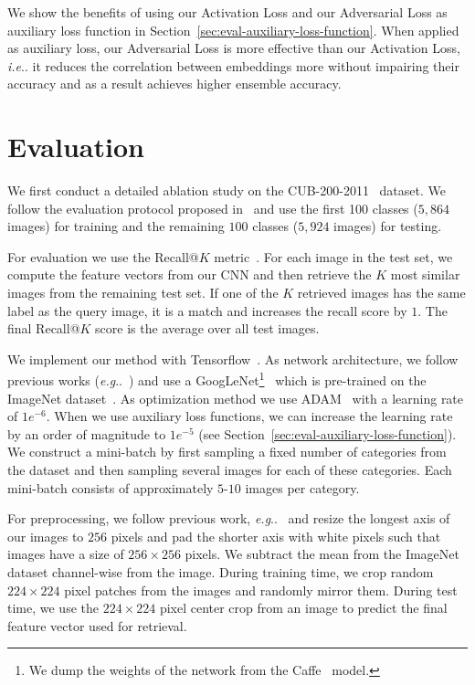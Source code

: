 \documentclass[10pt,journal,compsoc]{IEEEtran}
\makeatletter
\DeclareRobustCommand\onedot{\futurelet\@let@token\@onedot}
\def\@onedot{\ifx\@let@token.\else.\null\fi\xspace}
\def\eg{\emph{e.g}\onedot} \def\Eg{\emph{E.g}\onedot}
\def\ie{\emph{i.e}\onedot} \def\Ie{\emph{I.e}\onedot}
\makeatother
\begin{document}
We show the benefits of using our Activation Loss and our Adversarial Loss
as auxiliary loss function in
Section~\ref{sec:eval-auxiliary-loss-function}. When applied as auxiliary loss, our Adversarial
Loss is more effective than our Activation Loss, \ie it reduces the correlation
between embeddings more without impairing their accuracy and as a result achieves
higher ensemble accuracy.

\section{Evaluation}\label{sec:evaluation}

We first conduct a detailed ablation study on the CUB-200-2011~\cite{WahCUB_200_2011} dataset.
We follow the evaluation protocol proposed
in~\cite{oh2016deep} and use the first 100
classes ($5,864$ images) for training and the remaining $100$ classes ($5,924$
images) for testing.

For evaluation we use the Recall@$K$ metric~\cite{oh2016deep}. For each
image in the test set, we compute the feature vectors from our \ac{CNN} and
then retrieve the $K$ most similar images from the remaining test set. If one
of the $K$ retrieved images has the same label as the query image, it is a
match and increases the recall score by $1$.  The final Recall@$K$ score is the
average over all test images.

We implement our method with Tensorflow~\cite{tensorflow2015-whitepaper}. 
As network architecture, we follow previous works (\eg~\cite{oh2016deep, ustinova2016histogram}) and use a GoogLeNet\footnote{We dump the weights of the network from the Caffe~\cite{jia2014caffe} model.}~\cite{Szegedy2014} which is pre-trained
on the ImageNet dataset~\cite{ILSVRC15}.
As optimization method we use ADAM~\cite{KingmaB14} with a learning rate of $1e^{-6}$. When we use auxiliary loss functions, we can increase 
the learning rate by an order of magnitude to $1e^{-5}$ (see Section~\ref{sec:eval-auxiliary-loss-function}). 
We construct a mini-batch
by first sampling a fixed number of categories from the dataset and then sampling several
images for each of these categories. Each mini-batch consists of approximately $5$-$10$ images
per category. 

For preprocessing, we follow previous work, \eg~\cite{oh2016deep, ustinova2016histogram} and 
resize the longest axis of our images to $256$ pixels and pad the shorter axis with white pixels such that images have a size of 
$256 \times 256$ pixels. We subtract the mean from the ImageNet dataset channel-wise from the image.
During training time, we crop random $224 \times 224$ pixel patches from
the images and randomly mirror them. During test time, we use the $224 \times 224$ pixel center crop 
from an image to predict the final feature vector used for retrieval.
\end{document}
